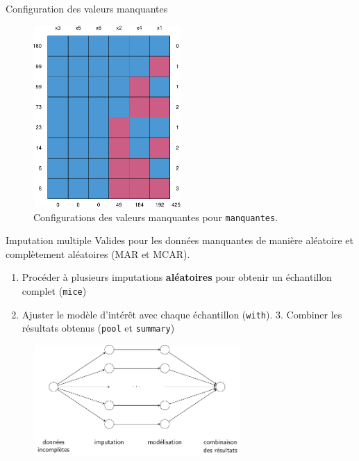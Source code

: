 \documentclass[
  ignorenonframetext,
]{beamer}
\providecommand{\tightlist}{%
  \setlength{\itemsep}{0pt}\setlength{\parskip}{0pt}}\usepackage{longtable,booktabs,array}
\begin{document}
\begin{frame}[fragile]{Configuration des valeurs manquantes}
\protect\hypertarget{configuration-des-valeurs-manquantes}{}
\begin{figure}

{\centering \includegraphics[width=0.5\textwidth,height=\textheight]{MATH60602-diapos13_files/figure-beamer/fig-manquantes2-1.pdf}

}

\caption{\label{fig-manquantes2}Configurations des valeurs manquantes
pour \texttt{manquantes}.}

\end{figure}
\end{frame}

\begin{frame}[fragile]{Imputation multiple}
\protect\hypertarget{imputation-multiple}{}
Valides pour les données manquantes de manière aléatoire et complètement
aléatoires (MAR et MCAR).

\begin{enumerate}
\tightlist
\item
  Procéder à plusieurs imputations \textbf{aléatoires} pour obtenir un
  échantillon complet (\texttt{mice})
\item
  Ajuster le modèle d'intérêt avec chaque échantillon (\texttt{with}).
  3. Combiner les résultats obtenus (\texttt{pool} et \texttt{summary})
\end{enumerate}

\begin{figure}

{\centering \includegraphics[width=0.7\textwidth,height=\textheight]{figures/donnees_manquantes_workflow.pdf}

}

\end{figure}
\end{frame}
\end{document}
